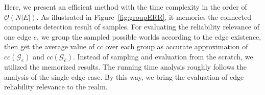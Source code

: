 Here, we present an efficient method with the time complexity in the order of $\mathcal{O}(N |E|)$.
As illustrated in Figure~\ref{fig:groupERR}, it memories the connected components detection result of samples. 
For evaluating the reliability relevance of one edge $e$, we group the sampled possible worlds according to the edge existence, 
then get the average value of $cc$ over each group as accurate approximation of $cc(\mathcal{G}_{e})$ and $cc(\mathcal{G}_{\bar{e}})$. 
Instead of sampling and evaluation from the scratch, we utilized the memorized results. 
The running time analysis roughly follows the analysis of the single-edge case.  
By this way, we bring the evaluation of edge reliability relevance to the realm.